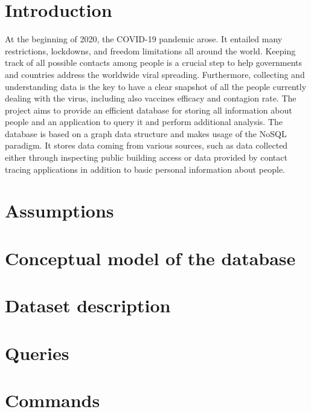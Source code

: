 \documentclass[a4paper, 12p]{article}
\begin{document}
\mbox{}


\tableofcontents
{}

\newpage

\setcounter{page}{1}
\section{Introduction}
At the beginning of 2020, the COVID-19 pandemic arose. It entailed many restrictions, lockdowns, and freedom limitations all around the world.
Keeping track of all possible contacts among people is a crucial step to help governments and countries address the worldwide viral spreading.
Furthermore, collecting and understanding data is the key to have a clear snapshot of all the people currently dealing with the virus, including also vaccines efficacy and contagion rate.
The project aims to provide an efficient database for storing all information about people and an application to query it and perform additional analysis.
The database is based on a graph data structure and makes usage of the NoSQL paradigm.
It stores data coming from various sources, such as data collected either through inspecting public building access or data provided by contact tracing applications in addition to basic personal information about people.

\section{Assumptions}


\newpage

\section{Conceptual model of the database}

\newpage
\section{Dataset description}


\section{Queries}

\newpage
\section{Commands}

\newpage
\end{document}
